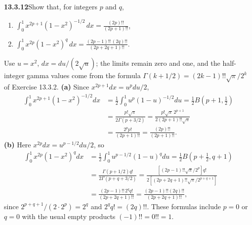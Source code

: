 \par\bigskip
\noindent\textbf{13.3.12}\quad Show that, for integers $p$ and $q$,
\begin{enumerate}
\item[(a)] $\displaystyle\int_{0}^{1}x^{2p+1}(1-x^{2})^{-1/2}\,dx
  =\frac{(2p)!!}{(2p+1)!!}$,
\item[(b)] $\displaystyle\int_{0}^{1}x^{2p}(1-x^{2})^{q}\,dx
  =\frac{(2p-1)!!\,(2q)!!}{(2p+2q+1)!!}$.
\end{enumerate}
\par\smallskip
{}
\solution
{}
Use $u=x^2$, $dx=du/(2\sqrt u)$; the limits remain zero and one,
and the half-integer gamma values come from the formula
$\Gamma(k+1/2)=(2k-1)!!\sqrt\pi/2^k$ of Exercise 13.3.2.
\textbf{(a)} Since $x^{2p+1}dx=u^pdu/2$,
\begin{align*}
\int_0^1x^{2p+1}(1-x^2)^{-1/2}dx
&=\frac12\int_0^1u^p(1-u)^{-1/2}du
=\frac12 B\left(p+1,\frac12\right)\\
&=\frac{p!\sqrt\pi}{2\Gamma(p+3/2)}
=\frac{p!\sqrt\pi\,2^{p+1}}{2(2p+1)!!\sqrt\pi}\\
&=\frac{2^pp!}{(2p+1)!!}
=\boxed{\frac{(2p)!!}{(2p+1)!!}}.
\end{align*}
\textbf{(b)} Here $x^{2p}dx=u^{p-1/2}du/2$, so
\begin{align*}
\int_0^1x^{2p}(1-x^2)^qdx
&=\frac12\int_0^1u^{p-1/2}(1-u)^qdu
=\frac12 B\left(p+\frac12,q+1\right)\\
&=\frac{\Gamma(p+1/2)q!}{2\Gamma(p+q+3/2)}
=\frac{[(2p-1)!!\sqrt\pi/2^p]q!}
 {2[(2p+2q+1)!!\sqrt\pi/2^{p+q+1}]}\\
&=\frac{(2p-1)!!\,2^qq!}{(2p+2q+1)!!}
=\boxed{\frac{(2p-1)!!(2q)!!}{(2p+2q+1)!!}},
\end{align*}
since $2^{p+q+1}/(2\cdot2^p)=2^q$ and $2^qq!=(2q)!!$.
These formulas include $p=0$ or $q=0$ with the usual empty
products $(-1)!!=0!!=1$.


